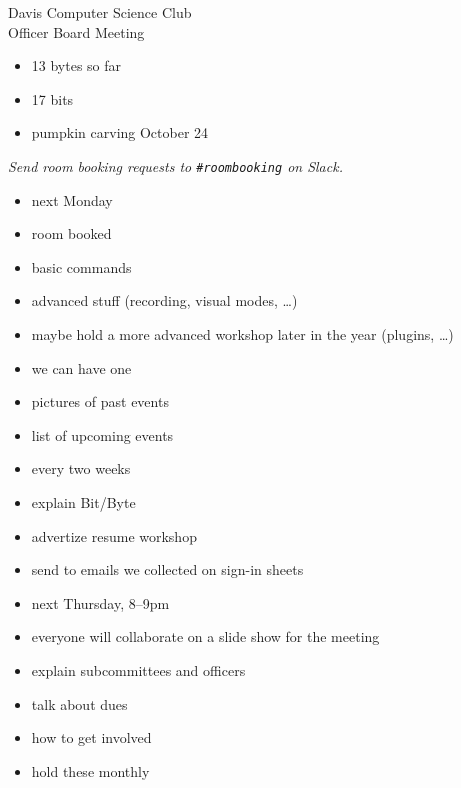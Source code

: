 \documentclass{article}
\begin{document}
\begin{Minutes}{Davis Computer Science Club\\Officer Board Meeting}




\maketitle
{}
\begin{itemize}
\item 13 bytes so far
\item 17 bits
\item pumpkin carving October 24
\end{itemize}

\textit{Send room booking requests to \texttt{\#roombooking} on Slack.}

\begin{itemize}
\item next Monday
\item room booked
\item basic commands
\item advanced stuff (recording, visual modes, \dots)
\item maybe hold a more advanced workshop later in the year (plugins, \dots)
\end{itemize}

\begin{itemize}
\item we can have one
\item pictures of past events
\item list of upcoming events
\item every two weeks
\item explain Bit/Byte
\item advertize resume workshop
\item send to emails we collected on sign-in sheets
\end{itemize}

\begin{itemize}
\item next Thursday, 8--9pm
\item everyone will collaborate on a slide show for the meeting
\item explain subcommittees and officers
\item talk about dues
\item how to get involved
\item hold these monthly
\end{itemize}


\end{Minutes}
\end{document}
